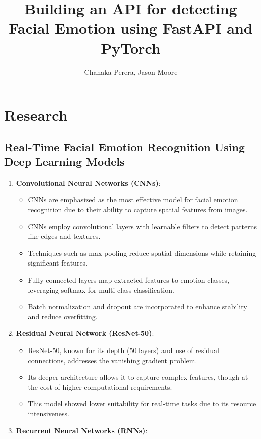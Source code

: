 \documentclass{article}
\title{Building an API for detecting Facial Emotion using FastAPI and PyTorch}
\author{Chanaka Perera, Jason Moore}
\begin{document}
\maketitle 

\section*{Research}

\subsection*{Real-Time Facial Emotion Recognition Using Deep Learning Models}

\begin{enumerate}
    \item \textbf{Convolutional Neural Networks (CNNs)}:
    \begin{itemize}
        \item CNNs are emphasized as the most effective model for facial emotion recognition due to their ability to capture spatial features from images.
        \item CNNs employ convolutional layers with learnable filters to detect patterns like edges and textures.
        \item Techniques such as max-pooling reduce spatial dimensions while retaining significant features.
        \item Fully connected layers map extracted features to emotion classes, leveraging softmax for multi-class classification.
        \item Batch normalization and dropout are incorporated to enhance stability and reduce overfitting.
    \end{itemize}
    \item \textbf{Residual Neural Network (ResNet-50)}:
    \begin{itemize}
        \item ResNet-50, known for its depth (50 layers) and use of residual connections, addresses the vanishing gradient problem.
        \item Its deeper architecture allows it to capture complex features, though at the cost of higher computational requirements.
        \item This model showed lower suitability for real-time tasks due to its resource intensiveness.
    \end{itemize}
    \item \textbf{Recurrent Neural Networks (RNNs)}:

\end{enumerate}
\end{document}
